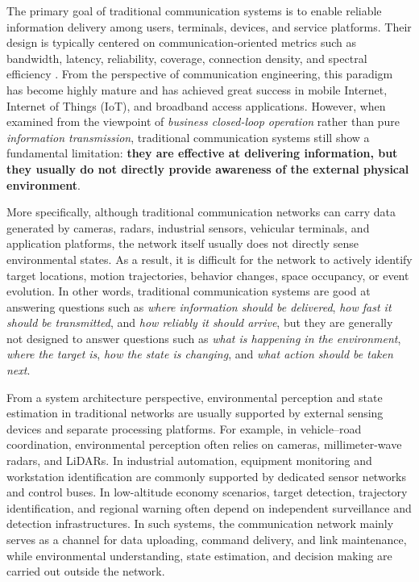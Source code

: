 The primary goal of traditional communication systems is to enable reliable information delivery among users, terminals, devices, and service platforms. Their design is typically centered on communication-oriented metrics such as bandwidth, latency, reliability, coverage, connection density, and spectral efficiency \cite{Goldsmith2005,Andrews2014, Shafi20175G}. From the perspective of communication engineering, this paradigm has become highly mature and has achieved great success in mobile Internet, Internet of Things (IoT), and broadband access applications. However, when examined from the viewpoint of \emph{business closed-loop operation} rather than pure \emph{information transmission}, traditional communication systems still show a fundamental limitation: \textbf{they are effective at delivering information, but they usually do not directly provide awareness of the external physical environment}.

More specifically, although traditional communication networks can carry data generated by cameras, radars, industrial sensors, vehicular terminals, and application platforms, the network itself usually does not directly sense environmental states. As a result, it is difficult for the network to actively identify target locations, motion trajectories, behavior changes, space occupancy, or event evolution. In other words, traditional communication systems are good at answering questions such as \emph{where information should be delivered}, \emph{how fast it should be transmitted}, and \emph{how reliably it should arrive}, but they are generally not designed to answer questions such as \emph{what is happening in the environment}, \emph{where the target is}, \emph{how the state is changing}, and \emph{what action should be taken next}.

From a system architecture perspective, environmental perception and state estimation in traditional networks are usually supported by external sensing devices and separate processing platforms. For example, in vehicle--road coordination, environmental perception often relies on cameras, millimeter-wave radars, and LiDARs. In industrial automation, equipment monitoring and workstation identification are commonly supported by dedicated sensor networks and control buses. In low-altitude economy scenarios, target detection, trajectory identification, and regional warning often depend on independent surveillance and detection infrastructures. In such systems, the communication network mainly serves as a channel for data uploading, command delivery, and link maintenance, while environmental understanding, state estimation, and decision making are carried out outside the network.

